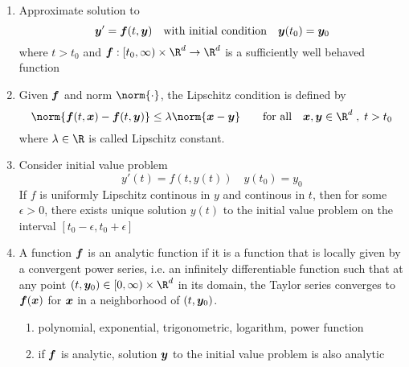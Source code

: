 \documentclass[11pt]{article}
\begin{document}
\section{}

\subsection{}


\begin{enumerate}
    \item {} Approximate solution to 
    \[
        \by' = \bf ( t, \by)
        \quad \text{with initial condition} \quad 
        \by ( t_0 ) = \by_0    
    \]
    where $t > t_0$ and $\bf: [t_0, \infty) \times \R^d \to \R^d$ is a sufficiently well behaved function
    \item {} Given $\bf$ and norm $\norm{\cdot}$, the Lipschitz condition is defined by 
    \[
        \norm{
            \bf(t, \bx) - \bf(t, \by)
        } \leq \lambda \norm{\bx - \by}
        \quad \quad
        \text{for all}
        \quad \bx, \by \in \R^d \;,\; t> t_0
    \]
    where $\lambda \in \R$ is called Lipschitz constant. 
    \item {} Consider initial value problem 
    \[
        y'(t) = f(t, y(t))
        \quad
        y(t_0) = y_0
    \]
    If $f$ is uniformly Lipschitz continous in $y$ and continous in $t$, then for some $\epsilon > 0$, there exists unique solution $y(t)$ to the initial value problem on the interval $[t_0 - \epsilon, t_0 + \epsilon]$ 
    \item {} A function $\bf$ is an analytic function if it is a function that is locally given by a convergent power series, i.e. an infinitely differentiable function such that at any point $(t,\by_0) \in [0, \infty)\times \R^d$ in its domain, the Taylor series converges to $\bf(\bx)$ for $\bx$ in a neighborhood of $(t,\by_0)$.
    \begin{enumerate}
        \item {} polynomial, exponential, trigonometric, logarithm, power function
        \item {} if $\bf$ is analytic, solution $\by$ to the initial value problem is also analytic
    \end{enumerate}
\end{enumerate}
\end{document}
